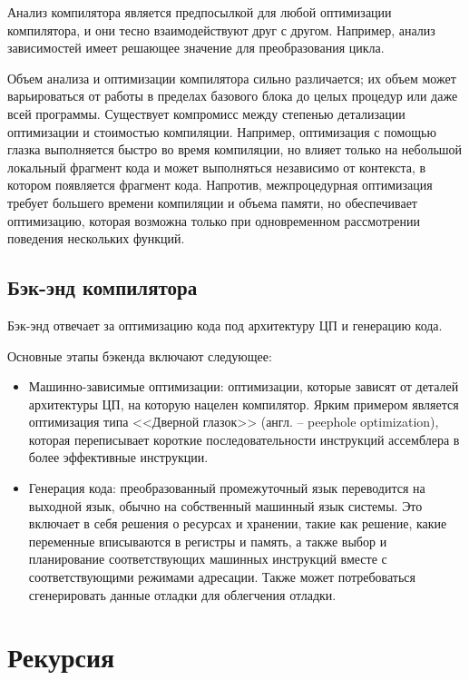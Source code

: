 Анализ компилятора является предпосылкой для любой оптимизации компилятора, и они тесно взаимодействуют друг с другом. Например, анализ зависимостей имеет решающее значение для преобразования цикла.

Объем анализа и оптимизации компилятора сильно различается; их объем может варьироваться от работы в пределах базового блока до целых процедур или даже всей программы. Существует компромисс между степенью детализации оптимизации и стоимостью компиляции. Например, оптимизация с помощью глазка выполняется быстро во время компиляции, но влияет только на небольшой локальный фрагмент кода и может выполняться независимо от контекста, в котором появляется фрагмент кода. Напротив, межпроцедурная оптимизация требует большего времени компиляции и объема памяти, но обеспечивает оптимизацию, которая возможна только при одновременном рассмотрении поведения нескольких функций. 

\subsection{Бэк-энд компилятора}\label{sec:ch1/sec5/subsec4}

Бэк-энд отвечает за оптимизацию кода под архитектуру ЦП и генерацию кода. 

Основные этапы бэкенда включают следующее: 

\begin{itemize}
    \item Машинно-зависимые оптимизации: оптимизации, которые зависят от деталей архитектуры ЦП, на которую нацелен компилятор. Ярким примером является оптимизация типа <<Дверной глазок>> (англ. -- peephole optimization), которая переписывает короткие последовательности инструкций ассемблера в более эффективные инструкции. 
    \item Генерация кода: преобразованный промежуточный язык переводится на выходной язык, обычно на собственный машинный язык системы. Это включает в себя решения о ресурсах и хранении, такие как решение, какие переменные вписываются в регистры и память, а также выбор и планирование соответствующих машинных инструкций вместе с соответствующими режимами адресации. Также может потребоваться сгенерировать данные отладки для облегчения отладки. 
\end{itemize}

\section{Рекурсия}\label{sec:ch1/sec6}

